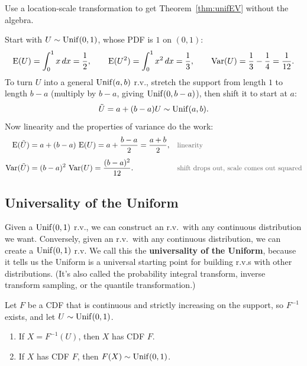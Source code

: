 \begin{example}
  Use a location-scale transformation to get Theorem~\ref{thm:unifEV} without the algebra.
\end{example}

\begin{solution}
  Start with $U \sim \operatorname{Unif}(0, 1)$, whose PDF is $1$ on $(0, 1)$:
  \[
    \operatorname{E}(U) = \int_{0}^{1} x\,dx = \frac{1}{2},
    \qquad
    \operatorname{E}(U^{2}) = \int_{0}^{1} x^{2}\,dx = \frac{1}{3},
    \qquad
    \operatorname{Var}(U) = \frac{1}{3} - \frac{1}{4} = \frac{1}{12}.
  \]
  To turn $U$ into a general $\operatorname{Unif}(a, b)$ r.v., stretch the support from length $1$ to length $b - a$ (multiply by $b - a$, giving $\operatorname{Unif}(0, b - a)$), then shift it to start at $a$:
  \[
    \tilde{U} = a + (b - a)U \sim \operatorname{Unif}(a, b).
  \]
  Now linearity and the properties of variance do the work:
  \begin{align*}
    \E(\tilde{U}) &= a + (b - a)\,\E(U) = a + \frac{b - a}{2} = \frac{a + b}{2},
      && \by{linearity} \\[0.4em]
    \Var(\tilde{U}) &= (b - a)^{2}\,\Var(U) = \frac{(b - a)^{2}}{12}.
      && \by{shift drops out, scale comes out squared}
  \end{align*}
\end{solution}

\subsection{Universality of the Uniform}

Given a $\operatorname{Unif}(0, 1)$ r.v., we can construct an r.v.\ with any continuous distribution we want. Conversely, given an r.v.\ with any continuous distribution, we can create a $\operatorname{Unif}(0, 1)$ r.v. We call this the \textbf{universality of the Uniform}, because it tells us the Uniform is a universal starting point for building r.v.s with other distributions. (It's also called the probability integral transform, inverse transform sampling, or the quantile transformation.)

\begin{theorem}\label{thm:universality}
  Let $F$ be a CDF that is continuous and strictly increasing on the support, so $F^{-1}$ exists, and let $U \sim \operatorname{Unif}(0, 1)$.
  \begin{enumerate}
    \item If $X = F^{-1}(U)$, then $X$ has CDF $F$.
    \item If $X$ has CDF $F$, then $F(X) \sim \operatorname{Unif}(0, 1)$.
  \end{enumerate}
\end{theorem}

